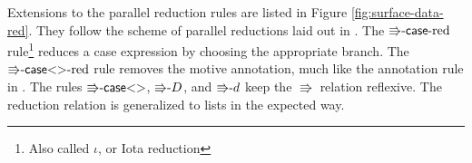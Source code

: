 
Extensions to the parallel reduction rules are listed in Figure \ref{fig:surface-data-red}.
They follow the scheme of parallel reductions laid out in .
The $\textrm{\ensuremath{\Rrightarrow}-\ensuremath{\mathsf{case}}-red}$ rule\footnote{Also called $\iota$, or Iota reduction} reduces a case expression by choosing the appropriate branch.
The $\textrm{\ensuremath{\Rrightarrow}-\ensuremath{\mathsf{case}}<>-red}$ rule removes the motive annotation, much like the annotation rule in .
The rules $\textrm{\ensuremath{\Rrightarrow}-\ensuremath{\mathsf{case}}<>}$, $\textrm{\ensuremath{\Rrightarrow}-}D$, and $\textrm{\ensuremath{\Rrightarrow}-}d$ keep the $\Rrightarrow$ relation reflexive.
The reduction relation is generalized to lists in the expected way.

